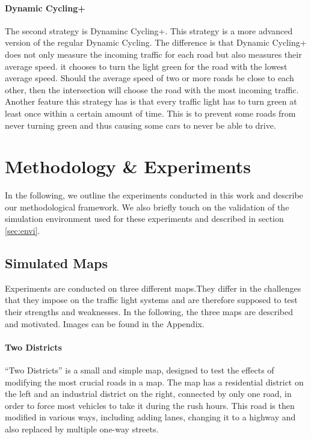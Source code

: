\documentclass[11pt]{article}
\begin{document}
\paragraph{Dynamic Cycling+} The second strategy is Dynaminc Cycling+. This strategy is a more advanced version of the regular Dynamic Cycling. The difference is that Dynamic Cycling+ does not only measure the incoming traffic for each road but also measures their average speed. it chooses to turn the light green for the road with the lowest average speed. Should the average speed of two or more roads be close to each other, then the intersection will choose the road with the most incoming traffic. Another feature this strategy has is that every traffic light has to turn green at least once within a certain amount of time. This is to prevent some roads from never turning green and thus causing some cars to never be able to drive.

\section{Methodology \& Experiments}
\label{sec:experiments}
In the following, we outline the experiments conducted in this work and describe our methodological framework. We also briefly touch on the validation of the simulation environment used for these experiments and described in section \ref{sec:envi}.

\subsection{Simulated Maps}
Experiments are conducted on three different maps.They differ in the challenges that they impose on the traffic light systems and are therefore supposed to test their strengths and weaknesses. In the following, the three maps are described and motivated. Images can be found in the Appendix.

\paragraph{Two Districts} “Two Districts” is a small and simple map, designed to test the effects of modifying the most crucial roads in a map. The map has a residential district on the left and an industrial district on the right, connected by only one road, in order to force most vehicles to take it during the rush hours. This road is then modified in various ways, including adding lanes, changing it to a highway and also replaced by multiple one-way streets. 
\end{document}
